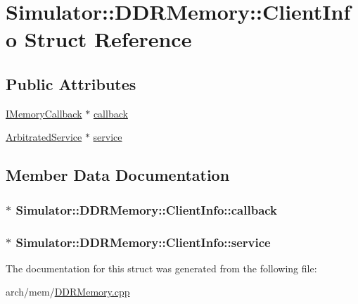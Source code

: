 \hypertarget{struct_simulator_1_1_d_d_r_memory_1_1_client_info}{\section{Simulator\+:\+:D\+D\+R\+Memory\+:\+:Client\+Info Struct Reference}
\label{struct_simulator_1_1_d_d_r_memory_1_1_client_info}
}
\subsection*{Public Attributes}
\begin{DoxyCompactItemize}
\item 
\hyperlink{class_simulator_1_1_i_memory_callback}{I\+Memory\+Callback} $\ast$ \hyperlink{struct_simulator_1_1_d_d_r_memory_1_1_client_info_ad3ccd1e34b2858b55114575f7e21b192}{callback}
\item 
\hyperlink{class_simulator_1_1_arbitrated_service}{Arbitrated\+Service} $\ast$ \hyperlink{struct_simulator_1_1_d_d_r_memory_1_1_client_info_a79dd4bc012c91be1e4bf90961b7a3567}{service}
\end{DoxyCompactItemize}


\subsection{Member Data Documentation}
\hypertarget{struct_simulator_1_1_d_d_r_memory_1_1_client_info_ad3ccd1e34b2858b55114575f7e21b192}{
\subsubsection[{callback}]{$\ast$ Simulator\+::\+D\+D\+R\+Memory\+::\+Client\+Info\+::callback}}\label{struct_simulator_1_1_d_d_r_memory_1_1_client_info_ad3ccd1e34b2858b55114575f7e21b192}
\hypertarget{struct_simulator_1_1_d_d_r_memory_1_1_client_info_a79dd4bc012c91be1e4bf90961b7a3567}{
\subsubsection[{service}]{$\ast$ Simulator\+::\+D\+D\+R\+Memory\+::\+Client\+Info\+::service}}\label{struct_simulator_1_1_d_d_r_memory_1_1_client_info_a79dd4bc012c91be1e4bf90961b7a3567}


The documentation for this struct was generated from the following file\+:\begin{DoxyCompactItemize}
\item 
arch/mem/\hyperlink{_d_d_r_memory_8cpp}{D\+D\+R\+Memory.\+cpp}\end{DoxyCompactItemize}
